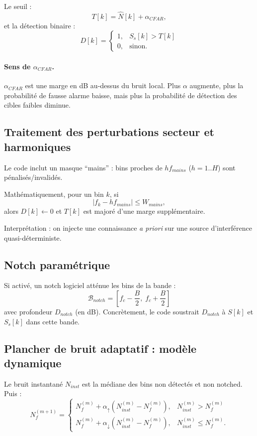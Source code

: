 \documentclass[a4paper,11pt]{article}
\begin{document}
Le seuil :
\[
T[k]=\widehat{N}[k]+\alpha_{CFAR},
\]
et la d\'etection binaire :
\[
D[k]=
\begin{cases}
1,& S_s[k]>T[k]\\
0,& \text{sinon}.
\end{cases}
\]

\paragraph{Sens de \(\alpha_{CFAR}\).}
\(\alpha_{CFAR}\) est une marge en dB au-dessus du bruit local. Plus \(\alpha\) augmente, plus la probabilit\'e de fausse alarme baisse, mais plus la probabilit\'e de d\'etection des cibles faibles diminue.

\subsection{Traitement des perturbations secteur et harmoniques}

Le code inclut un masque ``mains'' : bins proches de \(h f_{mains}\) (\(h=1..H\)) sont p\'enalis\'es/invalid\'es.

Math\'ematiquement, pour un bin \(k\), si
\[
|f_k-hf_{mains}|\le W_{mains},
\]
alors \(D[k]\leftarrow 0\) et \(T[k]\) est major\'e d'une marge suppl\'ementaire.

Interpr\'etation : on injecte une connaissance \emph{a priori} sur une source d'interf\'erence quasi-d\'eterministe.

\subsection{Notch param\'etrique}

Si activ\'e, un notch logiciel att\'enue les bins de la bande :
\[
\mathcal{B}_{notch}=\left[f_c-\frac{B}{2},\;f_c+\frac{B}{2}\right]
\]
avec profondeur \(D_{notch}\) (en dB). Concr\`etement, le code soustrait \(D_{notch}\) \`a \(S[k]\) et \(S_s[k]\) dans cette bande.

\subsection{Plancher de bruit adaptatif : mod\`ele dynamique}

Le bruit instantan\'e \(N_{inst}\) est la m\'ediane des bins non d\'etect\'es et non notched. Puis :
\[
N_f^{(m+1)}=
\begin{cases}
N_f^{(m)}+\alpha_{\uparrow}(N_{inst}^{(m)}-N_f^{(m)}), & N_{inst}^{(m)}>N_f^{(m)}\\
N_f^{(m)}+\alpha_{\downarrow}(N_{inst}^{(m)}-N_f^{(m)}), & N_{inst}^{(m)}\le N_f^{(m)}.
\end{cases}
\]
\end{document}
